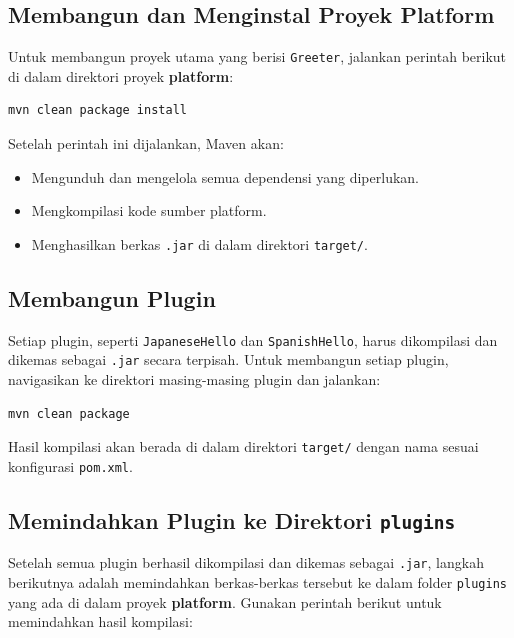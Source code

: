 \subsection{Membangun dan Menginstal Proyek Platform}

Untuk membangun proyek utama yang berisi \texttt{Greeter}, jalankan perintah berikut di dalam direktori proyek \textbf{platform}:

\begin{lstlisting}[language=bash, caption={Membangun Proyek Platform Menggunakan Maven}]
	mvn clean package install
\end{lstlisting}

Setelah perintah ini dijalankan, Maven akan:

\begin{itemize}
	\item Mengunduh dan mengelola semua dependensi yang diperlukan.
	\item Mengkompilasi kode sumber platform.
	\item Menghasilkan berkas \texttt{.jar} di dalam direktori \texttt{target/}.
\end{itemize}

\subsection{Membangun Plugin}

Setiap plugin, seperti \texttt{JapaneseHello} dan \texttt{SpanishHello}, harus dikompilasi dan dikemas sebagai \texttt{.jar} secara terpisah. Untuk membangun setiap plugin, navigasikan ke direktori masing-masing plugin dan jalankan:

\begin{lstlisting}[language=bash, caption={Membangun Plugin Menggunakan Maven}]
	mvn clean package 
\end{lstlisting}

Hasil kompilasi akan berada di dalam direktori \texttt{target/} dengan nama sesuai konfigurasi \texttt{pom.xml}.

\subsection{Memindahkan Plugin ke Direktori \texttt{plugins}}

Setelah semua plugin berhasil dikompilasi dan dikemas sebagai \texttt{.jar}, langkah berikutnya adalah memindahkan berkas-berkas tersebut ke dalam folder \texttt{plugins} yang ada di dalam proyek \textbf{platform}. Gunakan perintah berikut untuk memindahkan hasil kompilasi:

